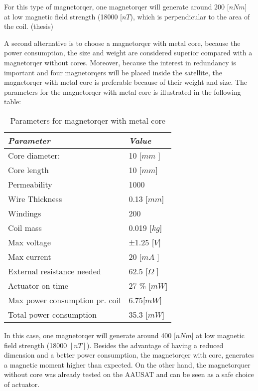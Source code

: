 For this type of magnetorqer, one magnetorqer will generate around 200 [$nNm$] at low magnetic field strength (18000 [$nT$), which is perpendicular to the area of the coil. (thesis)

A second alternative is to choose a magnetorqer with metal core, because the power consumption, the size and weight are considered superior compared with a magnetorqer without cores. Moreover, because the interest in redundancy is important and four magnetorqers will be placed inside the satellite, the magnetorqer with metal core is preferable because of their weight and size. The parameters for the magnetorqer with metal core is illustrated in the following table:
\begin{table}[H]
	\centering
	\begin{tabular}{|l|l|}
		\hline
		\textit{\textbf{Parameter}}     & \textit{\textbf{Value}}               \\ \hline
		Core diameter:                       & 10 {[}$mm$ {]}                           \\ \hline
		Core length             			   & 10 {[}$mm${]}                             \\ \hline
		Permeability                           & 1000                                      	     \\ \hline
		Wire Thickness                      & 0.13 [$mm$]                                 \\ \hline
		Windings                                & 200 											      \\ \hline
		Coil mass                               & 0.019 {[}$kg${]}                               \\ \hline
		Max voltage                			  & ±1.25 {[}$V${]}                                  \\ \hline
		Max current							  & 20 {[}$mA$ {]}                                    \\ \hline
		External resistance needed   & 62.5 {[}$\Omega$ {]} 					  	 \\ \hline
		Actuator on time			       & 27 \% {[}$mW${]}                                  \\ \hline
		Max power consumption pr. coil     & 6.75{[}$mW${]} 				           \\ \hline
		Total power consumption		& 35.3 {[}$mW${]}                                      \\ \hline
	\end{tabular}
	\caption{Parameters for magnetorqer with metal core}
	\label{table:for1}
\end{table}
In this case, one magnetorqer will generate around 400 [$nNm$] at low magnetic field strength (18000 $[nT]$). Besides the advantage of having a reduced dimension and a better power consumption, the magnetorqer with core, generates a magnetic moment higher than expected. On the other hand, the magnetorquer without core was already tested on the AAUSAT and can be seen as a safe choice of actuator.


